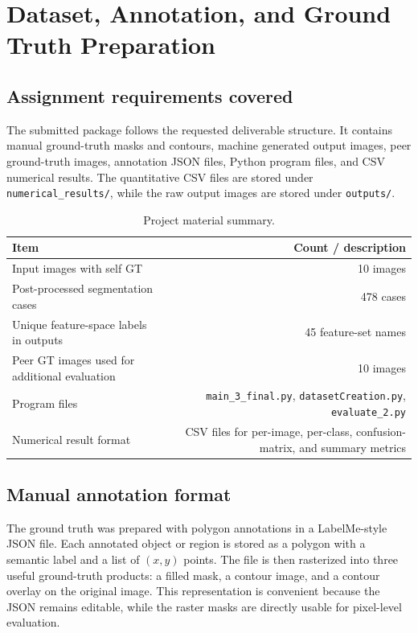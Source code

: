 
\section{Dataset, Annotation, and Ground Truth Preparation}
\subsection{Assignment requirements covered}
The submitted package follows the requested deliverable structure. It contains manual ground-truth masks and contours, machine generated output images, peer ground-truth images, annotation JSON files, Python program files, and CSV numerical results. The quantitative CSV files are stored under \texttt{numerical\_results/}, while the raw output images are stored under \texttt{outputs/}.

\begin{table}[H]
\centering
\caption{Project material summary.}
\begin{tabular}{@{}lr@{}}
\toprule
Item & Count / description \\
\midrule
Input images with self GT & 10 images \\
Post-processed segmentation cases & 478 cases \\
Unique feature-space labels in outputs & 45 feature-set names \\
Peer GT images used for additional evaluation & 10 images \\
Program files & \texttt{main\_3\_final.py}, \texttt{datasetCreation.py}, \texttt{evaluate\_2.py} \\
Numerical result format & CSV files for per-image, per-class, confusion-matrix, and summary metrics \\
\bottomrule
\end{tabular}
\label{tab:material-summary}
\end{table}

\subsection{Manual annotation format}
The ground truth was prepared with polygon annotations in a LabelMe-style JSON file. Each annotated object or region is stored as a polygon with a semantic label and a list of $(x,y)$ points. The file is then rasterized into three useful ground-truth products: a filled mask, a contour image, and a contour overlay on the original image. This representation is convenient because the JSON remains editable, while the raster masks are directly usable for pixel-level evaluation.

